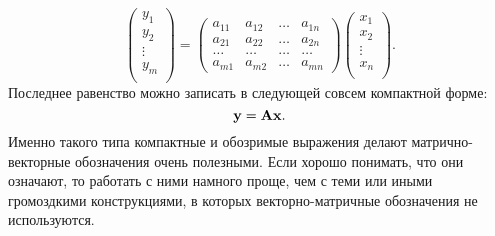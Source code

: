\begin{equation}
\label{lin-rav}
    \left(
     \begin{array}{c}
        y_{1} \\
        y_{2} \\
        \vdots \\
        y_{m}  \\
      \end{array}
    \right)=\left(
\begin{array}{cccc}
   a_{11} & a_{12} & \ldots & a_{1n} \\
   a_{21} & a_{22} & \ldots & a_{2n} \\
   \ldots& \ldots &\ldots &\ldots \\
   a_{m1} & a_{m2} & \ldots & a_{mn}
\end{array}
\right)\left(
     \begin{array}{c}
        x_{1} \\
        x_{2} \\
        \vdots \\
        x_{n}  \\
      \end{array}
    \right).
\end{equation}
    Последнее равенство можно записать в следующей совсем компактной
    форме:
\begin{equation}
    \label{lin-rav-vec}
    \mathbf{y}=\mathbf{A}\mathbf{x}.
\end{equation}
    Именно такого типа компактные и обозримые выражения делают
    матрично-векторные обозначения очень полезными. Если хорошо
    понимать, что они означают, то работать с ними
    намного проще, чем с теми или иными громоздкими конструкциями,
    в которых векторно-матричные обозначения не используются.

